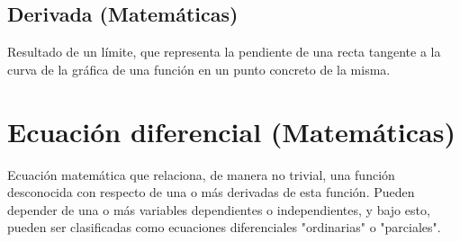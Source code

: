 
\subsection{Derivada (Matemáticas)}
Resultado de un límite, que representa la pendiente de una recta tangente a la curva de la gráfica de una función en un punto concreto de la misma.


\section{Ecuación diferencial (Matemáticas)}

Ecuación matemática que relaciona, de manera no trivial, una función desconocida con respecto de una o más derivadas de esta función. Pueden depender de una o más variables dependientes o independientes, y bajo esto, pueden ser clasificadas como ecuaciones diferenciales "ordinarias" o "parciales".


\pagebreak